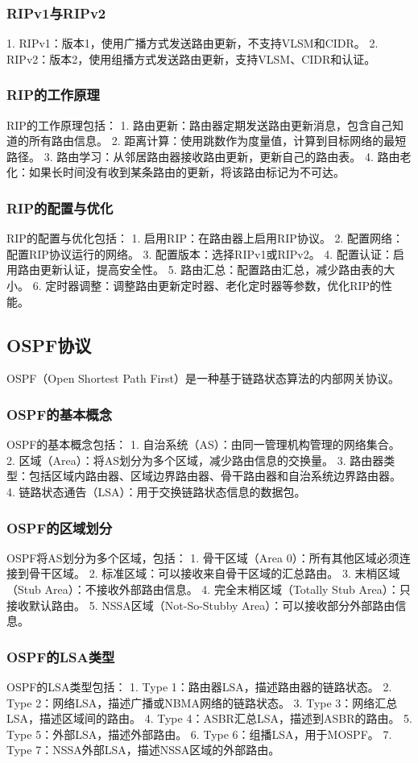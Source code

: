 \documentclass{book}
\begin{document}
\subsubsection{RIPv1与RIPv2}
1. RIPv1：版本1，使用广播方式发送路由更新，不支持VLSM和CIDR。
2. RIPv2：版本2，使用组播方式发送路由更新，支持VLSM、CIDR和认证。
\subsubsection{RIP的工作原理}
RIP的工作原理包括：
1. 路由更新：路由器定期发送路由更新消息，包含自己知道的所有路由信息。
2. 距离计算：使用跳数作为度量值，计算到目标网络的最短路径。
3. 路由学习：从邻居路由器接收路由更新，更新自己的路由表。
4. 路由老化：如果长时间没有收到某条路由的更新，将该路由标记为不可达。
\subsubsection{RIP的配置与优化}
RIP的配置与优化包括：
1. 启用RIP：在路由器上启用RIP协议。
2. 配置网络：配置RIP协议运行的网络。
3. 配置版本：选择RIPv1或RIPv2。
4. 配置认证：启用路由更新认证，提高安全性。
5. 路由汇总：配置路由汇总，减少路由表的大小。
6. 定时器调整：调整路由更新定时器、老化定时器等参数，优化RIP的性能。
\subsection{OSPF协议}
OSPF（Open Shortest Path First）是一种基于链路状态算法的内部网关协议。
\subsubsection{OSPF的基本概念}
OSPF的基本概念包括：
1. 自治系统（AS）：由同一管理机构管理的网络集合。
2. 区域（Area）：将AS划分为多个区域，减少路由信息的交换量。
3. 路由器类型：包括区域内路由器、区域边界路由器、骨干路由器和自治系统边界路由器。
4. 链路状态通告（LSA）：用于交换链路状态信息的数据包。
\subsubsection{OSPF的区域划分}
OSPF将AS划分为多个区域，包括：
1. 骨干区域（Area 0）：所有其他区域必须连接到骨干区域。
2. 标准区域：可以接收来自骨干区域的汇总路由。
3. 末梢区域（Stub Area）：不接收外部路由信息。
4. 完全末梢区域（Totally Stub Area）：只接收默认路由。
5. NSSA区域（Not-So-Stubby Area）：可以接收部分外部路由信息。
\subsubsection{OSPF的LSA类型}
OSPF的LSA类型包括：
1. Type 1：路由器LSA，描述路由器的链路状态。
2. Type 2：网络LSA，描述广播或NBMA网络的链路状态。
3. Type 3：网络汇总LSA，描述区域间的路由。
4. Type 4：ASBR汇总LSA，描述到ASBR的路由。
5. Type 5：外部LSA，描述外部路由。
6. Type 6：组播LSA，用于MOSPF。
7. Type 7：NSSA外部LSA，描述NSSA区域的外部路由。
\end{document}
